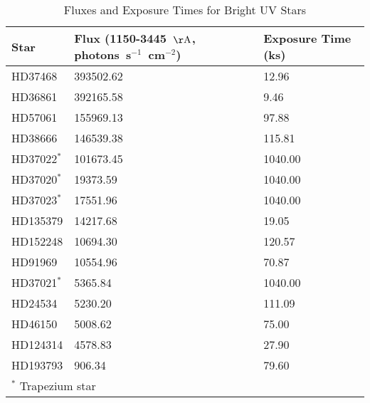 \begin{table*}
\caption{Fluxes and Exposure Times for Bright UV Stars\label{tab:star_fluxes}}
\begin{center}
\begin{tabular}{lll}
\hline
\hline
Star & Flux (1150-3445~${\rm \AA}$, photons~s$^{-1}$~cm$^{-2}$) & Exposure Time (ks) \\
\hline
HD37468 & 393502.62 & 12.96 \\
HD36861 & 392165.58 & 9.46 \\
HD57061 & 155969.13 & 97.88 \\
HD38666 & 146539.38 & 115.81 \\
HD37022$^*$ & 101673.45 & 1040.00 \\
HD37020$^*$ & 19373.59 & 1040.00 \\
HD37023$^*$ & 17551.96 & 1040.00 \\
HD135379 & 14217.68 & 19.05 \\
HD152248 & 10694.30 & 120.57 \\
HD91969 & 10554.96 & 70.87 \\
HD37021$^*$ & 5365.84 & 1040.00 \\
HD24534 & 5230.20 & 111.09 \\
HD46150 & 5008.62 & 75.00 \\
HD124314 & 4578.83 & 27.90 \\
HD193793 & 906.34 & 79.60 \\
\hline
\multicolumn{3}{p{.6\textwidth}}{$^*$ Trapezium star}
\end{tabular}
\end{center}
\end{table*}
